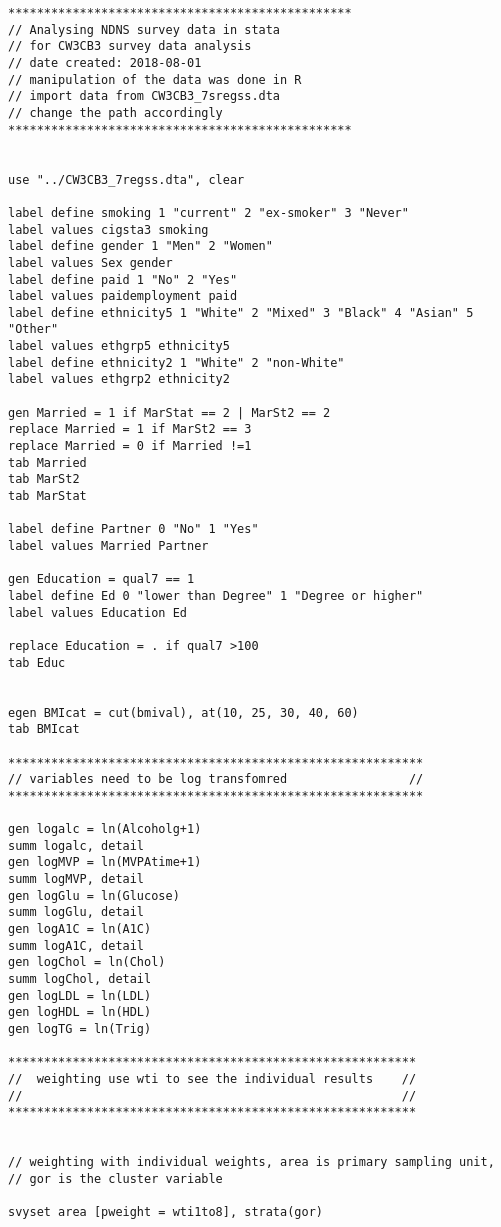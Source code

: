 



\begin{verbatim}
************************************************
// Analysing NDNS survey data in stata
// for CW3CB3 survey data analysis 
// date created: 2018-08-01
// manipulation of the data was done in R
// import data from CW3CB3_7sregss.dta
// change the path accordingly
************************************************


use "../CW3CB3_7regss.dta", clear

label define smoking 1 "current" 2 "ex-smoker" 3 "Never"
label values cigsta3 smoking
label define gender 1 "Men" 2 "Women"
label values Sex gender
label define paid 1 "No" 2 "Yes"
label values paidemployment paid
label define ethnicity5 1 "White" 2 "Mixed" 3 "Black" 4 "Asian" 5 "Other"
label values ethgrp5 ethnicity5
label define ethnicity2 1 "White" 2 "non-White"
label values ethgrp2 ethnicity2

gen Married = 1 if MarStat == 2 | MarSt2 == 2 
replace Married = 1 if MarSt2 == 3
replace Married = 0 if Married !=1
tab Married
tab MarSt2
tab MarStat

label define Partner 0 "No" 1 "Yes"
label values Married Partner

gen Education = qual7 == 1
label define Ed 0 "lower than Degree" 1 "Degree or higher"
label values Education Ed

replace Education = . if qual7 >100
tab Educ


egen BMIcat = cut(bmival), at(10, 25, 30, 40, 60)
tab BMIcat

**********************************************************
// variables need to be log transfomred                 //
**********************************************************

gen logalc = ln(Alcoholg+1)
summ logalc, detail
gen logMVP = ln(MVPAtime+1)
summ logMVP, detail
gen logGlu = ln(Glucose)
summ logGlu, detail
gen logA1C = ln(A1C)
summ logA1C, detail
gen logChol = ln(Chol)
summ logChol, detail
gen logLDL = ln(LDL)
gen logHDL = ln(HDL)
gen logTG = ln(Trig)

*********************************************************
//  weighting use wti to see the individual results    //
//                                                     //
*********************************************************


// weighting with individual weights, area is primary sampling unit, 
// gor is the cluster variable

svyset area [pweight = wti1to8], strata(gor)


\end{verbatim}
